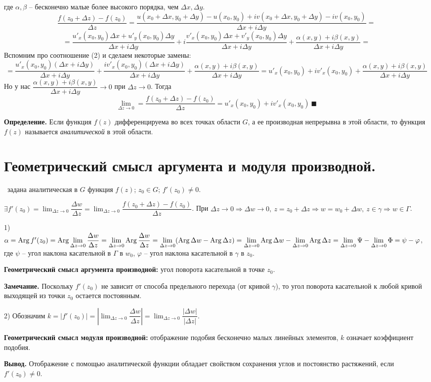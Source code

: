 \documentclass[9pt]{article}
\begin{document}
где \(\alpha,\beta\) -- бесконечно малые более высокого порядка, чем \(\Delta x, \Delta y\).
\[\dfrac{f(z_0+\Delta z)-f(z_0)}{\Delta z}=\dfrac{u(x_0+\Delta x,y_0+\Delta y)-u(x_0,y_0)+iv(x_0+\Delta x,y_0+\Delta y)-iv(x_0,y_0)}{\Delta x+i\Delta y}=\]
\[=\dfrac{u'_x(x_0,y_0)\Delta x+u'_y(x_0,y_0)\Delta y}{\Delta x+i\Delta y}+i\dfrac{v'_x(x_0,y_0)\Delta x+v'_y(x_0,y_0)\Delta y}{\Delta x+i\Delta y}+\dfrac{\alpha(x,y)+i\beta(x,y)}{\Delta x +i\Delta y}=\]
Вспомним про соотношение (2) и сделаем некоторые замены:
\[=\dfrac{u'_x(x_0,y_0)(\Delta x + i\Delta y)}{\Delta x + i\Delta y}+\dfrac{iv'_x(x_0,y_0)(\Delta x+i\Delta y)}{\Delta x + i\Delta y}+\dfrac{\alpha(x,y)+i\beta(x,y)}{\Delta x +i\Delta y}=u'_x(x_0,y_0)+iv'_x(x_0,y_0)+\dfrac{\alpha(x,y)+i\beta(x,y)}{\Delta x +i\Delta y}\]
Но у нас \(\dfrac{\alpha(x,y)+i\beta(x,y)}{\Delta x +i\Delta y}\to0\) при \(\Delta z\to0\). Тогда
\[\displaystyle\lim_{\Delta z\to0}=\dfrac{f(z_0+\Delta z)-f(z_0)}{\Delta z}=u'_x(x_0,y_0)+iv'_x(x_0,y_0)\ \blacksquare\]
\par\textbf{Определение.} Если функция \(f(z)\) дифференцируема во всех точках области \(G\), а ее производная непрерывна в этой области, то функция \(f(z)\) называется \textit{аналитической} в этой области. 

\section{Геометрический смысл аргумента и модуля производной.}

\ 
 задана аналитическая в \(G\) функция \(f(z)\); \(z_0\in G\); \(f'(z_0)\neq0\).

\par\(\exists f'(z_0)=\displaystyle\lim_{\Delta z\to0}\dfrac{\Delta w}{\Delta z}=\lim_{\Delta z\to0}\dfrac{f(z_0+\Delta z)-f(z_0)}{\Delta z}\). При \(\Delta z\to0\Rightarrow\Delta w\to0,\ z=z_0+\Delta z\Rightarrow w = w_0+\Delta w,\ z\in\gamma\Rightarrow w\in \Gamma\).
\par1) \(\alpha=\operatorname{Arg} f'(z_0)=\operatorname{Arg}\displaystyle\lim_{\Delta z\to0}\dfrac{\Delta w}{\Delta z}=\lim_{\Delta z\to0}\operatorname{Arg}\dfrac{\Delta w}{\Delta z}=\lim_{\Delta z\to0}(\operatorname{Arg}\Delta w-\operatorname{Arg}\Delta z)=\lim_{\Delta z\to0}\operatorname{Arg}\Delta w-\lim_{\Delta z\to0}\operatorname{Arg}\Delta z=\lim_{\Delta z\to0}\Psi-\lim_{\Delta z\to0}\Phi=\psi-\varphi\), где \(\psi\) -- угол наклона касательной в \(\Gamma\) в \(w_0\), \(\varphi\) -- угол наклона касательной в \(\gamma\) в \(z_0\).  
\par\textbf{Геометрический смысл аргумента производной:} угол поворота касательной в точке \(z_0\).
\par\textbf{Замечание.} Поскольку \(f'(z_0)\) не зависит от способа предельного перехода (от кривой \(\gamma\)), то угол поворота касательной к любой кривой выходящей из точки \(z_0\) остается постоянным.
\par2) Обозначим \(k=|f'(z_0)|=|\displaystyle\lim_{\Delta z\to0}\dfrac{\Delta w}{\Delta z}|=\lim_{\Delta z\to0}\dfrac{|\Delta w|}{|\Delta z|}\).
\par\textbf{Геометрический смысл модуля производной:} отображение подобия бесконечно малых линейных элементов, \(k\) означает коэффициент подобия.
\par\textbf{Вывод.} Отображение с помощью аналитической функции обладает свойством сохранения углов и постоянство растяжений, если \(f'(z_0)\neq0\).
\end{document}
